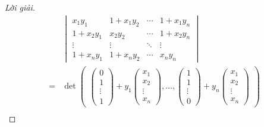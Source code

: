 \documentclass[class=linearalgebra,crop=false]{standalone}
\begin{document}
\begin{proof}[Lời giải]
    \begingroup
    \allowdisplaybreaks
    \begin{align*}
          & \begin{vmatrix}
                x_{1}y_{1}     & 1 + x_{1}y_{2} & \cdots & 1 + x_{1}y_{n} \\
                1 + x_{2}y_{1} & x_{2}y_{2}     & \cdots & 1 + x_{2}y_{n} \\
                \vdots         & \vdots         & \ddots & \vdots         \\
                1 + x_{n}y_{1} & 1 + x_{n}y_{2} & \cdots & x_{n}y_{n}
            \end{vmatrix}                                                                               \\
        = &
        \det\begin{pmatrix}
                \begin{pmatrix}
                0      \\
                1      \\
                \vdots \\
                1
            \end{pmatrix}
                +
                y_{1}\begin{pmatrix}
                     x_{1}  \\
                     x_{2}  \\
                     \vdots \\
                     x_{n}
                 \end{pmatrix},
                \ldots,
                \begin{pmatrix}
                1      \\
                1      \\
                \vdots \\
                0
            \end{pmatrix}
                +
                y_{n}\begin{pmatrix}
                     x_{1}  \\
                     x_{2}  \\
                     \vdots \\
                     x_{n}
                 \end{pmatrix}
            \end{pmatrix}                                                                                                        \\

\end{align*}
\end{proof}
\end{document}
